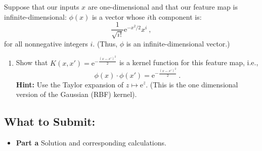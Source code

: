 \documentclass{article}
\providecommand*{\eu}{\ensuremath{\mathrm{e}}}
\begin{document}
\begin{aprob}
     Suppose that our inputs $x$ are one-dimensional and that our feature map is infinite-dimensional: 
    $\phi( x) $ is a vector whose $i$th component is:
    $$\frac{1}{\sqrt{i!}} \eu^{-x^2/2}x^i\ ,$$
    for all nonnegative integers $i$. (Thus, $\phi$ is an infinite-dimensional vector.)
    \begin{enumerate}
        \item Show that $K(x, x') = \eu^{-\frac{(x-x')^2}{2}}$ is a kernel function for this feature map, i.e., 
        $$\phi (x) \cdot \phi (x') = \eu^{-\frac{(x-x')^2}{2}}\ .$$
        \textbf{Hint:} Use the Taylor expansion of $z \mapsto \eu^z$.
        (This is the one dimensional version of the Gaussian  (RBF) kernel).
        \iffalse
        \Yuanyuan{Commented this out.}
        \item Now, we are given a dataset of size $n$, i.e., $\{x_1,\ldots, x_n\}$, where each $x$ is one-dimensional. Let $G$ be the kernel matrix $G \in \R^{n\times n}$, where the $(i,j)$-th entry of $G$ is $G_{i,j} = K(x_i, x_j)$.
        Show that the kernel matrix is symmetric, and positive semi-definite, i.e.,
        \begin{align*}
            K &= K^\top \\
            x^\top K x &\geq 0 \text{ for any column vector }x 
        \end{align*}
        
        \textbf{Hint}: Matrix $K$ can be written as $K = \Phi(x)^\top \Phi(x)$, where matrix $\Phi := [\phi(x_1), \ldots, \phi(x_n)]$.
        \fi
    
        
        
    
    \end{enumerate}
    \subsection*{What to Submit:}
    \begin{itemize}
        \item \textbf{Part a} Solution and corresponding calculations. 
    \end{itemize}
\end{aprob}
\end{document}

